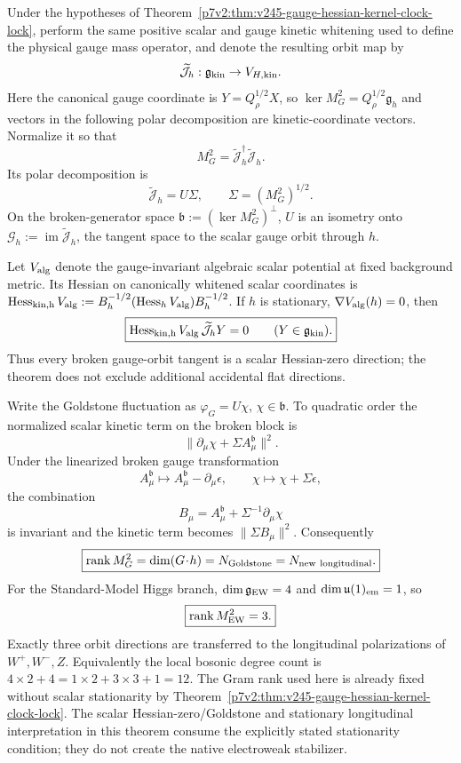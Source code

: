 \documentclass[12pt,a4paper]{article}
\begin{document}
\begin{theorem}
\label{p7v2:thm:v247-goldstone-hessian-transfer}
Under the hypotheses of
Theorem~\ref{p7v2:thm:v245-gauge-hessian-kernel-clock-lock}, perform the same
positive scalar and gauge kinetic whitening used to define the physical gauge
mass operator, and denote the resulting orbit map by
\[
 \widetilde{\mathcal J}_h:\mathfrak g_{\rm kin}\to V_{H,\rm kin}.
\]
Here the canonical gauge coordinate is \(Y=Q_\rho^{1/2}X\),
so \(\ker M_G^2=Q_\rho^{1/2}\mathfrak g_h\) and vectors in the
following polar decomposition are kinetic-coordinate vectors.
Normalize it so that
\[
 \boxed{M_G^2=\widetilde{\mathcal J}_h^\dagger
 \widetilde{\mathcal J}_h.}
\]
Its polar decomposition is
\[
 \boxed{\widetilde{\mathcal J}_h=U\Sigma,
 \qquad \Sigma=(M_G^2)^{1/2}.}
\]
On the broken-generator space
\(\mathfrak b:=(\ker M_G^2)^\perp\), \(U\) is an isometry onto
\(\mathcal G_h:=\operatorname{im}\widetilde{\mathcal J}_h\), the tangent
space to the scalar gauge orbit through \(h\).

Let \(V_{\rm alg}\) denote the gauge-invariant algebraic scalar potential at
fixed background metric. Its Hessian on canonically whitened scalar
coordinates is
\(\operatorname{Hess}_{\rm kin,h}V_{\rm alg}
:=B_h^{-1/2}(\operatorname{Hess}_hV_{\rm alg})B_h^{-1/2}\).
If \(h\) is stationary, \(\nabla V_{\rm alg}(h)=0\), then
\[
 \boxed{\operatorname{Hess}_{\rm kin,h}V_{\rm alg}\,
 \widetilde{\mathcal J}_hY=0\qquad(Y\in\mathfrak g_{\rm kin}).}
\]
Thus every broken gauge-orbit tangent is a scalar Hessian-zero direction;
the theorem does not exclude additional accidental flat directions.

Write the Goldstone fluctuation as \(\varphi_G=U\chi\),
\(\chi\in\mathfrak b\).  To quadratic order the normalized scalar kinetic
term on the broken block is
\[
 \boxed{\|\partial_\mu\chi+\Sigma A_\mu^{\mathfrak b}\|^2.}
\]
Under the linearized broken gauge transformation
\[
 A_\mu^{\mathfrak b}\mapsto A_\mu^{\mathfrak b}-\partial_\mu\epsilon,
 \qquad
 \chi\mapsto\chi+\Sigma\epsilon,
\]
the combination
\[
 \boxed{B_\mu=A_\mu^{\mathfrak b}+\Sigma^{-1}\partial_\mu\chi}
\]
is invariant and the kinetic term becomes \(\|\Sigma B_\mu\|^2\).
Consequently
\[
 \boxed{\operatorname{rank}M_G^2
 =\dim(G\!\cdot\! h)
 =N_{\rm Goldstone}
 =N_{\rm new\ longitudinal}.}
\]
For the Standard-Model Higgs branch,
\(\dim\mathfrak g_{\rm EW}=4\) and
\(\dim\mathfrak u(1)_{\rm em}=1\), so
\[
 \boxed{\operatorname{rank}M_{\rm EW}^2=3.}
\]
Exactly three orbit directions are transferred to the longitudinal
polarizations of \(W^+,W^-,Z\).  Equivalently the local bosonic degree count
is \(4\times2+4=1\times2+3\times3+1=12\).  The Gram rank used here is already fixed without scalar stationarity by Theorem~\ref{p7v2:thm:v245-gauge-hessian-kernel-clock-lock}.  The scalar Hessian-zero/Goldstone and stationary longitudinal interpretation in this theorem consume the explicitly stated stationarity condition; they do not create the native electroweak stabilizer.
\end{theorem}
\end{document}
